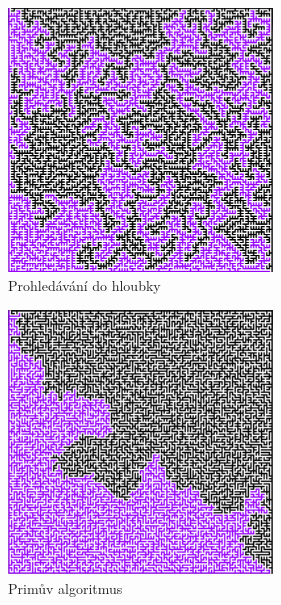 \documentclass[11pt]{article}
\begin{document}
\begin{figure}[ht!]
\centering
	\includegraphics[width=7cm]{dfsmaze.png}
	\caption{Prohledávání do hloubky}
\end{figure}

\begin{figure}[ht!]
\centering
	\includegraphics[width=7cm]{primmaze.png}
	\caption{Primův algoritmus}
\end{figure}
\end{document}
